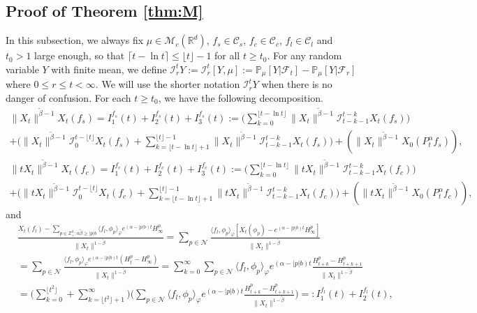 \documentclass[12pt,a4paper]{amsart}
\theoremstyle{plain}
\theoremstyle{definition}
\numberwithin{equation}{section}
\begin{document}
\subsection{Proof of Theorem \ref{thm:M}}
\label{sec: main}
In this subsection, we always fix $\mu \in \mathcal M_c(\mathbb R^d)$, $f_s\in \mathcal C_s$,  $f_c\in \mathcal C_c$, $f_l\in \mathcal C_l$ and $t_0>1$ large enough, so that $\lceil t-\ln t\rceil \leq \lfloor t \rfloor - 1$ for all $t\geq t_0$.
	For any random variable $Y$ with finite mean, we define $\mathcal I_r^t Y:= \mathcal I_r^t [Y, \mu] := \mathbb P_\mu[Y|\mathscr F_t] - \mathbb P_\mu[Y|\mathscr F_r]$ where $0 \leq r \leq t <\infty.$
	We will use the shorter notation $\mathcal I_r^t Y$ when there is no danger of confusion.
For each $t\geq t_0$, we have the following decomposition.
  \begin{multline}
    \label{eq:PM:CLTS:1}
     \|X_t\|^{\tilde \beta - 1}  X_t(f_s)
     = I^{f_s}_1(t) + I^{f_s}_2(t) + I^{f_s}_3(t)
    := \Big(\sum_{k=0}^{\lfloor t-\ln t \rfloor}  \|X_t\|^{\tilde \beta - 1} \mathcal I_{t-k-1}^{t-k} X_t(f_s) \Big)\\
    + \Big(  \|X_t\|^{\tilde \beta - 1} \mathcal I_0^{t-\lfloor t \rfloor} X_t(f_s)   + \sum_{k=\lfloor t-\ln t \rfloor+1}^{\lfloor t \rfloor-1} \|X_t\|^{\tilde \beta - 1} \mathcal I_{t-k-1}^{t-k} X_t(f_s) \Big) + ( \|X_t\|^{\tilde \beta - 1}X_0(P_t^\alpha f_s) ),
  \end{multline}
  \begin{multline}
    \label{eq:PM:CLTS:2}
     \|tX_t\|^{\tilde \beta - 1}  X_t(f_c)
     = I^{f_c}_1(t) + I^{f_c}_2(t) + I^{f_c}_3(t)
    := \Big(\sum_{k=0}^{\lfloor t-\ln t \rfloor}  \|tX_t\|^{\tilde \beta - 1} \mathcal I_{t-k-1}^{t-k} X_t(f_c) \Big)\\
    + \Big(  \|tX_t\|^{\tilde \beta - 1} \mathcal I_0^{t-\lfloor t \rfloor} X_t(f_c)   + \sum_{k=\lfloor t-\ln t \rfloor+1}^{\lfloor t \rfloor-1} \|tX_t\|^{\tilde \beta - 1} \mathcal I_{t-k-1}^{t-k} X_t(f_c) \Big) + ( \|tX_t\|^{\tilde \beta - 1}X_0(P_t^\alpha f_c) ),
  \end{multline}
and
 \begin{align}
    & \frac{X_t(f_l) - \sum_{p\in \mathbb Z_+^d: \alpha \tilde \beta \geq |p|b} \langle f_l,\phi_p\rangle_\varphi e^{(\alpha - |p|b)t}H_\infty^p}{\|X_t\|^{1- \tilde \beta}}
      = \sum_{p\in \mathcal N}\frac{ \langle f_l,\phi_p\rangle_\varphi [X_t(\phi_p) - e^{(\alpha - |p|b)t}H_\infty^p]}{\|X_t\|^{1- \tilde \beta}}
    \\& = \sum_{p \in \mathcal N} \frac{\langle f_l,\phi_p\rangle_\varphi e^{(\alpha - |p|b)t}(H_t^p - H_\infty^p)}{\|X_t\|^{1- \tilde \beta}}
    = \sum_{k=0}^\infty \sum_{p \in \mathcal N}  \langle f_l,\phi_p\rangle_\varphi e^{(\alpha - |p|b)t}\frac{ H_{t+k}^p - H_{t+k+1}^p}{\|X_t\|^{1- \tilde \beta}}
    \\ &= \Big(\sum_{k = 0}^{\lfloor t^2 \rfloor}  +\sum_{k = \lfloor t^2 \rfloor+1}^\infty \Big)\Big(\sum_{p \in \mathcal N}  \langle f_l,\phi_p\rangle_\varphi e^{(\alpha - |p|b)t}\frac{ H_{t+k}^p - H_{t+k+1}^p}{\|X_t\|^{1- \tilde \beta}}\Big)
         = : I^{f_l}_1(t) + I^{f_l}_2(t),
  \end{align}
\end{document}
